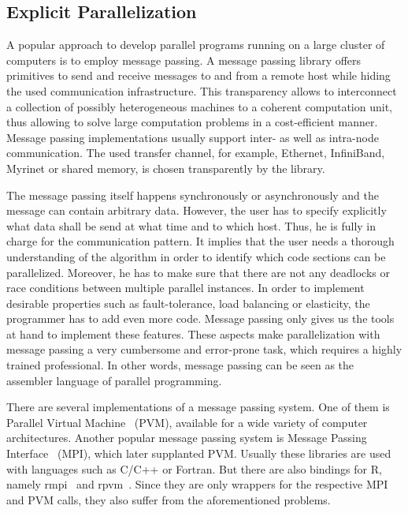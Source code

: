 \subsection{Explicit Parallelization}

A popular approach to develop parallel programs running on a large cluster of computers is to employ message passing.
A message passing library offers primitives to send and receive messages to and from a remote host while hiding the used communication infrastructure.
This transparency allows to interconnect a collection of possibly heterogeneous machines to a coherent computation unit, thus allowing to solve large computation problems in a cost-efficient manner.
Message passing implementations usually support inter- as well as intra-node communication.
The used transfer channel, for example, Ethernet, InfiniBand, Myrinet or shared memory, is chosen transparently by the library.

The message passing itself happens synchronously or asynchronously and the message can contain arbitrary data.
However, the user has to specify explicitly what data shall be send at what time and to which host.
Thus, he is fully in charge for the communication pattern.
It implies that the user needs a thorough understanding of the algorithm in order to identify which code sections can be parallelized.
Moreover, he has to make sure that there are not any deadlocks or race conditions between multiple parallel instances.
In order to implement desirable properties such as fault-tolerance, load balancing or elasticity, the programmer has to add even more code.
Message passing only gives us the tools at hand to implement these features.
These aspects make parallelization with message passing a very cumbersome and error-prone task, which requires a highly trained professional.
In other words, message passing can be seen as the assembler language of parallel programming.

There are several implementations of a message passing system.
One of them is Parallel Virtual Machine~\cite{geist:1994a} (PVM), available for a wide variety of computer architectures.
Another popular message passing system is Message Passing Interface~\cite{lusk:2009a} (MPI), which later supplanted PVM.
Usually these libraries are used with languages such as C/C++ or Fortran.
But there are also bindings for R, namely rmpi~\cite{rmpi} and rpvm~\cite{rpvm}.
Since they are only wrappers for the respective MPI and PVM calls, they also suffer from the aforementioned problems.

